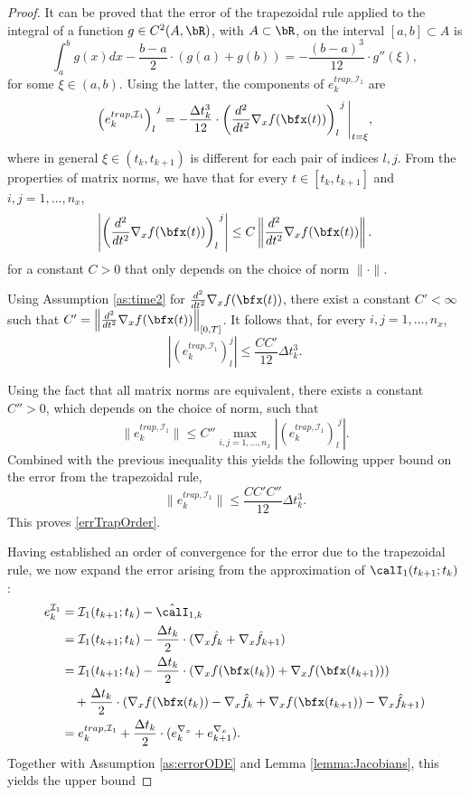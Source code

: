 \documentclass[DIV=12]{scrartcl} %
\newcommand{\err}{\ensuremath{e}}
\theoremstyle{definition}
\begin{document}
\begin{proof}
It can be proved \cite[Sec. 5.2.1]{SauerTim2006Na} that the error of the trapezoidal rule applied to the integral of a function $g\in C^2(A,\bR)$, with $A\subset\bR$, on the interval $[a,b]\subset A$ is
\begin{equation}
    \label{trapezoidalRuleError}
    \int_a^bg(x)dx-\frac{b-a}{2}\cdot(g(a)+g(b))=-\frac{(b-a)^3}{12}\cdot g''(\xi),
\end{equation}
for some $\xi\in(a,b)$. Using the latter, the components of $\err_k^{trap,\mathcal{I}_1}$ are
\begin{equation}
    \label{errTrapIntermediate}
    \left(\err_k^{trap,\mathcal{I}_1}\right)_{l}^{~j}=-\frac{\Delta t_k^3}{12}\cdot\left( \frac{d^2}{dt^2}\nabla_xf(\bfx(t))\right)_l^{~j}\Bigg|_{t=\xi},
\end{equation}
where in general $\xi\in(t_k,t_{k+1})$ is different for each pair of indices $l,j$. From the properties of matrix norms, we have that for every $t\in[t_k,t_{k+1}]$ and $i,j=1,\dots,n_x$,
\[
\left|\left(\frac{d^2}{dt^2}\nabla_xf(\bfx(t))\right)_l^{~j}\right|\le C \left\lVert \frac{d^2}{dt^2}\nabla_xf(\bfx(t))\right\rVert.
\]
for a constant $C>0$ that only depends on the choice of norm $\|\cdot\|$.

Using Assumption \ref{as:time2} for $\frac{d^2}{dt^2}\nabla_xf(\bfx(t))$, there exist a constant $C' <\infty$ such that  $C'=\left\|\frac{d^2}{dt^2}\nabla_xf(\bfx(t))\right\|_{[0,T]}$. It follows that, for every $i,j=1,\dots,n_x$,
\[
\left|\left(\err_k^{trap,\mathcal{I}_1}\right)_{l}^j\right|\le\frac{CC'}{12}\Delta t_k^3.
\]

Using the fact that all matrix norms are equivalent, there exists a constant $C''>0$, which depends on the choice of norm, such that
\[ 
\|\err_k^{trap,\mathcal{I}_1}\|\le C'' \max_{i,j=1,\dots,n_x}\left|\left(\err_k^{trap,\mathcal{I}_1}\right)_{l}^{~j}\right|.
\]
Combined with the previous inequality this yields the following upper bound on the error from the trapezoidal rule,
\[
\|\err_k^{trap,\mathcal{I}_1}\|\le \frac{CC'C''}{12}\Delta t_k^3.
\]
This proves \eqref{errTrapOrder}.

Having established an order of convergence for the error due to the trapezoidal rule, we now expand the error arising from the approximation of $\calI _{1} (t_{k+1};t_k)$:
\begin{align*}
    \err_k^{\mathcal{I}_{1}} &= \mathcal{I}_1(t_{k+1};t_k) - \hat{\calI}_{1,k} \\
    &=  \mathcal{I}_1(t_{k+1};t_k) - \frac{\Delta t_k}{2}\cdot (\nabla_x\hat{f}_k + \nabla_x\hat{f}_{k+1})\nonumber\\
    &=\mathcal{I}_1(t_{k+1};t_k) -\frac{\Delta t_k}{2}\cdot(\nabla_xf(\bfx(t_k)) +\nabla_xf(\bfx(t_{k+1})))\\
    & \quad +\frac{\Delta t_k}{2}\cdot(\nabla_xf(\bfx(t_k)) -\nabla_x\hat{f}_k+\nabla_xf(\bfx(t_{k+1})) - \nabla_x\hat{f}_{k+1})\nonumber\\
    &=\err_k^{trap,\mathcal{I}_1} + \frac{\Delta t_k}{2}\cdot(\err_k^{\nabla_x}+\err_{k+1}^{\nabla_x})\label{errI1}.
\end{align*}
Together with Assumption \ref{as:errorODE} and Lemma \ref{lemma:Jacobians}, this yields the upper bound


\end{proof}
\end{document}
